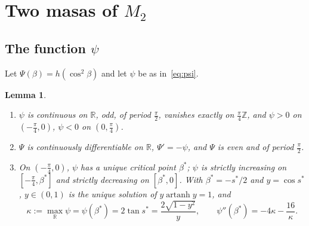 \documentclass[11pt]{article}
\DeclareMathOperator{\artanh}{artanh}
\newcommand{\R}{\mathbb{R}}
\newcommand{\Z}{\mathbb{Z}}
\theoremstyle{plain}
\newtheorem{lemma}[theorem]{Lemma}
\theoremstyle{definition}
\theoremstyle{remark}
\begin{document}
\section{Two masas of \texorpdfstring{$M_2$}{M2}}\label{sec:n2}

\subsection{The function \texorpdfstring{$\psi$}{psi}}

Let $\Psi(\beta)=h(\cos^2\beta)$ and let $\psi$ be as in~\eqref{eq:psi}.

\begin{lemma}\label{lem:psi}
\begin{enumerate}
\item[(a)] $\psi$ is continuous on $\R$, odd, of period $\frac\pi2$, vanishes exactly on $\frac\pi4\Z$, and $\psi>0$ on
$(-\frac\pi4,0)$, $\psi<0$ on $(0,\frac\pi4)$.
\item[(b)] $\Psi$ is continuously differentiable on $\R$, $\Psi'=-\psi$, and $\Psi$ is even and of period $\frac\pi2$.
\item[(c)] On $(-\frac\pi4,0)$, $\psi$ has a unique critical point $\beta^*$; $\psi$ is strictly increasing on $[-\frac\pi4,\beta^*]$ and
strictly decreasing on $[\beta^*,0]$. With $\beta^*=-s^*/2$ and $y=\cos s^*$, $y\in(0,1)$ is the unique solution of
$y\artanh y=1$, and
\[
  \kappa:=\max_\R\psi=\psi(\beta^*)=2\tan s^*=\frac{2\sqrt{1-y^2}}{y},\qquad \psi''(\beta^*)=-4\kappa-\frac{16}\kappa .
\]
\end{enumerate}
\end{lemma}
\end{document}

